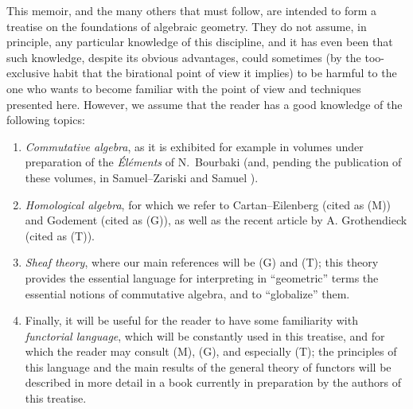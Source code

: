 This memoir, and the many others that must follow, are intended to form a
treatise on the foundations of algebraic geometry. They do not assume, in
principle, any particular knowledge of this discipline, and it has even been
that such knowledge, despite its obvious advantages, could sometimes (by the
too-exclusive habit that the birational point of view it implies) to be harmful
to the one who wants to become familiar with the point of view and techniques
presented here. However, we assume that the reader has a good knowledge of the
following topics:
\begin{enumerate}[label=(\alph*)]
  \item {\em Commutative algebra}, as it is exhibited for example in
    volumes under preparation of the {\em \'El\'ements} of N.~Bourbaki
    (and, pending the publication of these volumes, in Samuel--Zariski
    \cite{I-13} and Samuel \cite{I-11,I-12}).
  \item {\em Homological algebra}, for which we refer to Cartan--Eilenberg
    \cite{I-2} (cited as (M)) and Godement \cite{I-4} (cited as (G)), as well
    as the recent article by A. Grothendieck \cite{I-6} (cited as (T)).
  \item {\em Sheaf theory}, where our main references will be (G) and (T);
    this theory provides the essential language for interpreting in
    ``geometric'' terms the essential notions of commutative algebra,
    and to ``globalize'' them.
  \item Finally, it will be useful for the reader to have some familiarity with
    {\em functorial language}, which will be constantly used in this
    treatise, and for which the reader may consult (M), (G), and especially
    (T); the principles of this language and the main results of the general
    theory of functors will be described in more detail in a book currently
    in preparation by the authors of this treatise.
\end{enumerate}

\sectionbreak

